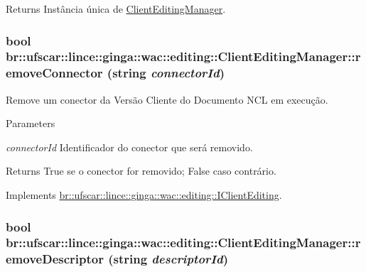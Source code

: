 \begin{DoxyReturn}{Returns}
Instância única de \hyperlink{classbr_1_1ufscar_1_1lince_1_1ginga_1_1wac_1_1editing_1_1ClientEditingManager}{ClientEditingManager}. 
\end{DoxyReturn}
\hypertarget{classbr_1_1ufscar_1_1lince_1_1ginga_1_1wac_1_1editing_1_1ClientEditingManager_a5b6ddc8a6259b07eae8f2c2f03dcdfaa}{
\subsubsection[{removeConnector}]{\setlength{\rightskip}{0pt plus 5cm}bool br::ufscar::lince::ginga::wac::editing::ClientEditingManager::removeConnector (string {\em connectorId})}}
\label{classbr_1_1ufscar_1_1lince_1_1ginga_1_1wac_1_1editing_1_1ClientEditingManager_a5b6ddc8a6259b07eae8f2c2f03dcdfaa}


Remove um conector da Versão Cliente do Documento NCL em execução. 


\begin{DoxyParams}{Parameters}
\item[{\em connectorId}]Identificador do conector que será removido. \end{DoxyParams}
\begin{DoxyReturn}{Returns}
True se o conector for removido; False caso contrário. 
\end{DoxyReturn}


Implements \hyperlink{classbr_1_1ufscar_1_1lince_1_1ginga_1_1wac_1_1editing_1_1IClientEditing_a415ff450552523a495db85c15004c6f9}{br::ufscar::lince::ginga::wac::editing::IClientEditing}.

\hypertarget{classbr_1_1ufscar_1_1lince_1_1ginga_1_1wac_1_1editing_1_1ClientEditingManager_a9b25cb3580c52ddb8147ede64ec53077}{
\subsubsection[{removeDescriptor}]{\setlength{\rightskip}{0pt plus 5cm}bool br::ufscar::lince::ginga::wac::editing::ClientEditingManager::removeDescriptor (string {\em descriptorId})}}
\label{classbr_1_1ufscar_1_1lince_1_1ginga_1_1wac_1_1editing_1_1ClientEditingManager_a9b25cb3580c52ddb8147ede64ec53077}


